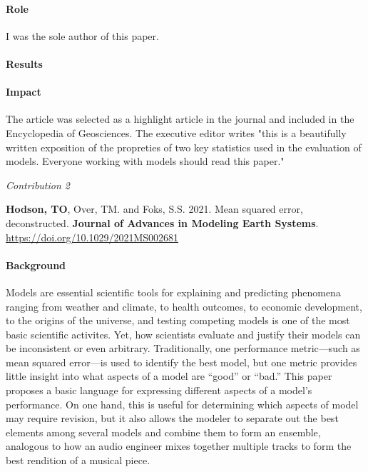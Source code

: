\documentclass[12pt]{article}
\begin{document}
\paragraph{Role}
I was the sole author of this paper.

\paragraph{Results} 

\paragraph{Impact} 
The article was selected as a highlight article in the journal and
included in the Encyclopedia of Geosciences.
The executive editor writes "this is a beautifully written exposition of the propreties
of two key statistics used in the evaluation of models. Everyone working with models
should read this paper."


\vspace{10pt}
\raggedright \textit{Contribution 2} \\
\vspace{10pt}

\textbf{Hodson, TO}, Over, TM. and Foks, S.S. 2021.
Mean squared error, deconstructed.
\textbf{Journal of Advances in Modeling Earth Systems}. \url{https://doi.org/10.1029/2021MS002681}

\paragraph{Background}
Models are essential scientific tools for explaining and predicting phenomena
ranging from weather and climate, to health outcomes, to economic development,
to the origins of the universe, and testing competing models is one of the most
basic scientific activites.
Yet, how scientists evaluate and justify their models can be inconsistent or even arbitrary.
Traditionally, one performance metric—such as mean squared error—is used to identify the best model, 
but one metric provides little insight into what aspects of a model are “good” or “bad.” 
This paper proposes a basic language for expressing different aspects of a model's performance. 
On one hand, this is useful for determining which aspects of model may require revision, 
but it also allows the modeler to separate out the best elements among several models and combine them to form an ensemble, 
analogous to how an audio engineer mixes together multiple tracks to form the best rendition of a musical piece.
\end{document}
